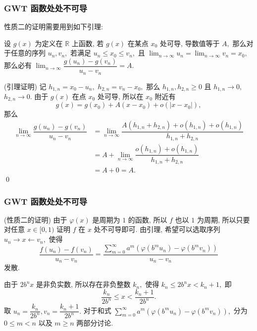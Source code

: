 \begin{frame}
\frametitle{GWT 函数处处不可导}

性质二的证明需要用到如下引理:

\begin{lem}
设 $g(x)$ 为定义在 $\mathbb{R}$ 上函数, 若 $g(x)$ 在某点 $x_0$ 处可导, 导数值等于 $A,$ 那么对于任意的序列 $u_n, v_n,$ 若满足 $u_n \leqslant x_0 \leqslant v_n,$ 且 $\displaystyle \lim_{n\to\infty} u_n = \lim_{n\to\infty} v_n = x_0,$ 那么必有 $\displaystyle \lim_{n\to\infty} \dfrac{g(u_n) - g(v_n)}{u_n - v_n} = A.$
\end{lem}

\pause

\startproof[bg=yellow, fg=red](引理证明)
记 $h_{1,n} = x_0 - u_n,$ $h_{2,n} = v_n - x_0,$ 那么 $h_{1,n}, h_{2,n} \geqslant 0$ 且 $h_{1,n} \to 0,$ $h_{2,n} \to 0.$ 由于 $g(x)$ 在点 $x_0$ 处可导, 所以在 $x_0$ 附近有
\begin{equation*}
g(x) = g(x_0) + A (x - x_0) + o(|x - x_0|),
\end{equation*}
那么
\begin{align*}
\lim_{n\to\infty} \dfrac{g(u_n) - g(v_n)}{u_n - v_n} & = \lim_{n\to\infty} \dfrac{A (h_{1,n} + h_{2,n}) + o(h_{1,n}) + o(h_{1,n})}{h_{1,n} + h_{2,n}} \\
& = A + \lim_{n\to\infty} \dfrac{o(h_{1,n}) + o(h_{1,n})}{h_{1,n} + h_{2,n}} \\
& = A + 0 = A.
\end{align*}
\qed

\end{frame}


\begin{frame}
\frametitle{GWT 函数处处不可导}

\startproof[bg=yellow, fg=red](性质二的证明)
由于 $\varphi(x)$ 是周期为 $1$ 的函数, 所以 $f$ 也以 $1$ 为周期, 所以只要对任意 $x \in [0, 1)$ 证明 $f$ 在 $x$ 处不可导即可. 由引理, 希望可以选取序列 $u_n \rightarrow x \leftarrow v_n,$ 使得
\begin{equation*}
\dfrac{f(u_n) - f(v_n)}{u_n - v_n}
= \dfrac{\sum\limits_{m=0}^{\infty} a^m (\varphi(b^m u_n) - \varphi(b^m v_n))}{u_n - v_n}
\end{equation*}
发散.

\pause
\vspace{1em}

由于 $2 b^n x$ 是非负实数, 所以存在非负整数 $k_n,$ 使得 $k_n \leqslant 2 b^n x < k_n + 1,$ 即
\begin{equation*}
\dfrac{k_n}{2 b^n} \leqslant x < \dfrac{k_n + 1}{2 b^n}.
\end{equation*}
取 $u_n = \dfrac{k_n}{2 b^n}, v_n = \dfrac{k_n + 1}{2 b^n}.$ 对于和式 $\displaystyle \sum\limits_{m=0}^{\infty} a^m (\varphi(b^m u_n) - \varphi(b^m v_n)),$ 分为 $0 \leqslant m < n$ 以及 $m \geqslant n$ 两部分讨论.

\end{frame}

